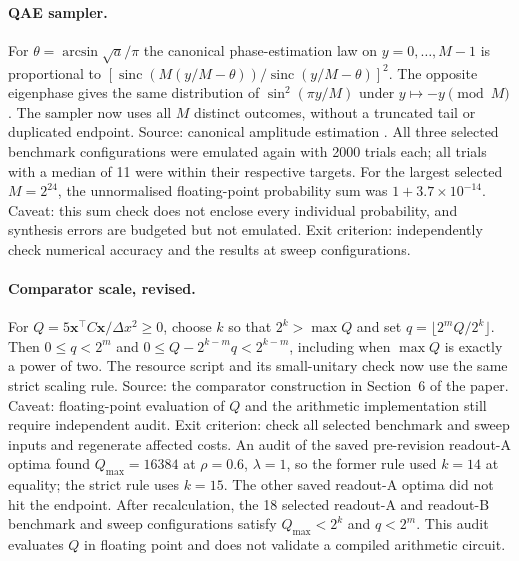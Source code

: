 \documentclass[11pt,a4paper]{article}
\begin{document}
\paragraph{QAE sampler.}
For $\theta=\arcsin\sqrt a/\pi$ the canonical phase-estimation law on
$y=0,\ldots,M-1$ is proportional to
$[\operatorname{sinc}(M(y/M-\theta))/\operatorname{sinc}(y/M-\theta)]^2$.
The opposite eigenphase gives the same distribution of
$\sin^2(\pi y/M)$ under $y\mapsto-y\pmod M$. The sampler now uses all $M$
distinct outcomes, without a truncated tail or duplicated endpoint. Source:
canonical amplitude estimation \cite{brassard2002}. All three selected
benchmark configurations were emulated again with 2000 trials each; all
trials with a median of 11 were within their respective targets. For the
largest selected $M=2^{24}$, the unnormalised floating-point probability sum
was $1+3.7\times10^{-14}$. Caveat: this sum check does not enclose every
individual probability, and synthesis errors are budgeted but not emulated.
Exit criterion: independently check numerical accuracy and the results at sweep
configurations.

\paragraph{Comparator scale, revised.}
For $Q=5\mathbf x^\top C\mathbf x/\Delta x^2\ge0$, choose $k$ so that
$2^k>\max Q$ and set $q=\lfloor2^mQ/2^k\rfloor$. Then
$0\le q<2^m$ and $0\le Q-2^{k-m}q<2^{k-m}$, including when $\max Q$ is
exactly a power of two. The resource script and its small-unitary check now
use the same strict scaling rule. Source: the comparator construction in
Section~6 of the paper. Caveat: floating-point evaluation of $Q$ and the
arithmetic implementation still require independent audit. Exit criterion:
check all selected benchmark and sweep inputs and regenerate affected costs.
An audit of the saved pre-revision readout-A optima found $Q_{\max}=16384$
at $\rho=0.6$, $\lambda=1$, so the former rule used $k=14$ at equality;
the strict rule uses $k=15$. The other saved readout-A optima did not hit
the endpoint. After recalculation, the 18 selected readout-A and readout-B
benchmark and sweep configurations satisfy $Q_{\max}<2^k$ and $q<2^m$.
This audit evaluates $Q$ in floating point and does not validate a compiled
arithmetic circuit.
\end{document}
